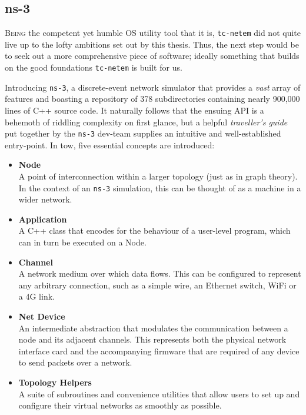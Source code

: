\subsection{ns-3}

\lettrine{B}{eing} the competent yet humble OS utility tool that it is, \texttt{tc-netem} did not quite live up to the
lofty ambitions set out by this thesis. Thus, the next step would be to seek out a more comprehensive piece of software;
ideally something that builds on the good foundations \texttt{tc-netem} is built for us.

Introducing \texttt{ns-3}, a discrete-event network simulator that provides a \emph{vast} array of
features\cite{ns_3_man} and boasting a repository of 378 subdirectories containing nearly 900,000 lines of C++ source
code\cite{ns_3_gitlab}. It naturally follows that the ensuing API is a behemoth of riddling complexity on first
glance, but a helpful \emph{traveller's guide} put together by the \texttt{ns-3} dev-team supplies an intuitive and
well-established entry-point\cite{ns_3_man_pdf}. In tow, five essential concepts are introduced:
\begin{itemize}
    \item \textbf{Node} \\
    A point of interconnection within a larger topology (just as in graph theory). In the context of an \texttt{ns-3}
    simulation, this can be thought of as a machine in a wider network.
    \item \textbf{Application} \\
    A C++ class that encodes for the behaviour of a user-level program, which can in turn be executed on a Node.
    \item \textbf{Channel} \\
    A network medium over which data flows. This can be configured to represent any arbitrary connection, such as a
    simple wire, an Ethernet switch, WiFi or a 4G link.
    \item \textbf{Net Device} \\
    An intermediate abstraction that modulates the communication between a node and its adjacent channels. This
    represents both the physical network interface card and the accompanying firmware that are required of any device
    to send packets over a network.
    \item \textbf{Topology Helpers} \\
    A suite of subroutines and convenience utilities that allow users to set up and configure their virtual networks
    as smoothly as possible.
\end{itemize}

